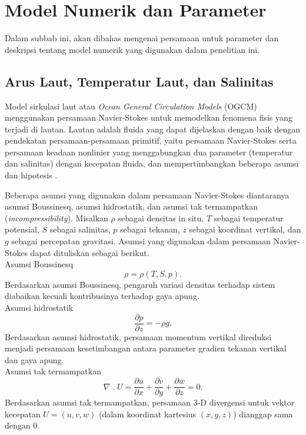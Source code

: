 \section[Model Numerik dan Parameter]{Model Numerik dan Parameter}
\begin{spacing}{1.5}
	\par Dalam subbab ini, akan dibahas mengenai persamaan untuk parameter dan deskripsi tentang model numerik yang digunakan dalam penelitian ini.
	\subsection[Arus Laut, Temperatur Laut, dan Salinitas]{Arus Laut, Temperatur Laut, dan Salinitas}
	
	Model sirkulasi laut atau \textit{Ocean General Circulation Models} (OGCM) menggunakan persamaan Navier-Stokes untuk memodelkan fenomena fisis yang terjadi di lautan. Lautan adalah fluida yang dapat dijelaskan dengan baik dengan pendekatan persamaan-persamaan primitif, yaitu persamaan Navier-Stokes serta persamaan keadaan nonlinier yang menggabungkan dua parameter (temperatur dan salinitas) dengan kecepatan fluida, dan mempertimbangkan beberapa asumsi dan hipotesis .
	
	Beberapa asumsi yang digunakan dalam persamaan Navier-Stokes diantaranya asumsi Boussinesq, asumsi hidrostatik, dan asumsi tak termampatkan (\textit{incompressibility}). Misalkan $\rho$ sebagai densitas in situ, $T$ sebagai temperatur potensial, $S$ sebagai salinitas, $p$ sebagai tekanan, $z$ sebagai koordinat vertikal, dan $g$ sebagai percepatan gravitasi. Asumsi yang digunakan dalam persamaan Navier-Stokes dapat dituliskan sebagai berikut.\\
	Asumsi Boussinesq
	\begin{equation}\label{eq:P1}
		\rho = \rho(T,S,p).
	\end{equation}
	Berdasarkan asumsi Boussinesq, pengaruh variasi densitas terhadap sistem diabaikan kecuali kontribusinya terhadap gaya apung.\\
	Asumsi hidrostatik
	\begin{equation}
		\frac{\partial p}{\partial z} = -\rho g.
	\end{equation}
	Berdasarkan asumsi hidrostatik, persamaan momentum vertikal direduksi menjadi persamaan kesetimbangan antara parameter gradien tekanan vertikal dan gaya apung.\\
	Asumsi tak termampatkan
	\begin{equation}
		\nabla \;.\; U =\frac{\partial u}{\partial x} + \frac{\partial v}{\partial y} + \frac{\partial w}{\partial z} = 0.
	\end{equation}	
	Berdasarkan asumsi tak termampatkan, persamaan 3-D divergensi untuk vektor kecepatan $U = (u,v,w)$ (dalam koordinat kartesius $(x,y,z)$) dianggap sama dengan 0.
	

\end{spacing}
